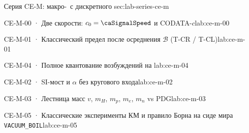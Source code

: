 
\begin{labseries}{Серия CE-M: макро-\Tlayer\ с дискретного \Mlayer}{sec:lab-series-ce-m}

\begin{labrecord}{CE-M-00 · Две скорости: $c_0=\caSignalSpeed$ и CODATA-$c$}{lab:ce-m-00}

\end{labrecord}

\begin{labrecord}{CE-M-01 · Классический предел после осреднения $\mathcal{B}$ (T-CR / T-CL)}{lab:ce-m-01}

\end{labrecord}

\begin{labrecord}{CE-M-04 · Полное квантование возбуждений на \Mlayer}{lab:ce-m-04}

\end{labrecord}

\begin{labrecord}{CE-M-02 · SI-мост и $\alpha$ без кругового входа}{lab:ce-m-02}

\end{labrecord}

\begin{labrecord}{CE-M-03 · Лестница масс $v$, $m_H$, $m_p$, $m_e$, $m_n$ vs PDG}{lab:ce-m-03}

\end{labrecord}

\begin{labrecord}{CE-M-05 · Классические эксперименты КМ и правило Борна на сиде мира \texttt{VACUUM\_BOIL}}{lab:ce-m-05}

\end{labrecord}

\end{labseries}
